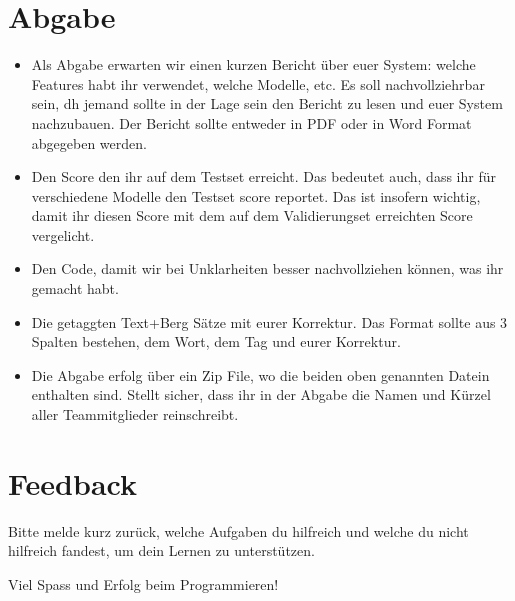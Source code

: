 \documentclass[a4paper,10pt]{article}
\begin{document}
\section{Abgabe}
\begin{itemize}
\item Als Abgabe erwarten wir einen kurzen Bericht über euer System: welche Features habt ihr verwendet, welche Modelle, etc. Es soll nachvollziehrbar sein, dh jemand sollte in der Lage sein den Bericht zu lesen und euer System nachzubauen. Der Bericht sollte entweder in PDF oder in Word Format abgegeben werden. 
\item Den Score den ihr auf dem Testset erreicht. Das bedeutet auch, dass ihr für verschiedene Modelle den Testset score reportet. Das ist insofern wichtig, damit ihr diesen Score mit dem auf dem Validierungset erreichten Score vergelicht.
\item Den Code, damit wir bei Unklarheiten besser nachvollziehen können, was ihr gemacht habt.
\item Die getaggten Text+Berg Sätze mit eurer Korrektur. Das Format sollte aus 3 Spalten bestehen, dem Wort, dem Tag und eurer Korrektur. 
\item Die Abgabe erfolg über ein Zip File, wo die beiden oben genannten Datein enthalten sind. Stellt sicher, dass ihr in der Abgabe die Namen und Kürzel aller Teammitglieder reinschreibt.
\end{itemize}
\section{Feedback}
Bitte melde kurz zurück, welche Aufgaben du hilfreich und welche du nicht hilfreich fandest, um dein Lernen zu unterstützen.

\hfil Viel Spass und Erfolg beim Programmieren!
\end{document}

